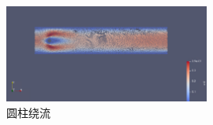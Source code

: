 \begin{frame}
    \begin{figure}[H]
        \centering
        \includegraphics[width=0.6\textwidth]{images/cylindar.png}
        \caption{圆柱绕流}
    \end{figure}
\end{frame}